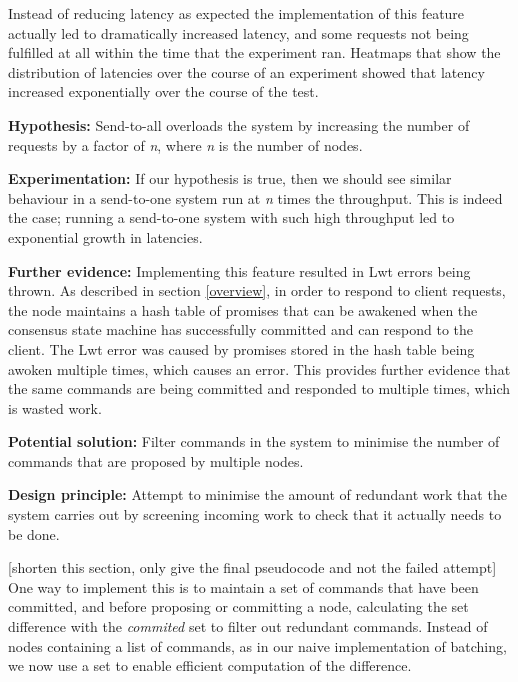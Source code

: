 Instead of reducing latency as expected the implementation of this feature actually led to dramatically increased latency, and some requests not being fulfilled at all within the time that the experiment ran. Heatmaps that show the distribution of latencies over the course of an experiment showed that latency increased exponentially over the course of the test.

\textbf{Hypothesis: } Send-to-all overloads the system by increasing the number of requests by a factor of \textit{n}, where \textit{n} is the number of nodes.

\textbf{Experimentation: } If our hypothesis is true, then we should see similar behaviour in a send-to-one system run at \textit{n} times the throughput. This is indeed the case; running a send-to-one system with such high throughput led to exponential growth in latencies.

\textbf{Further evidence: } Implementing this feature resulted in Lwt errors being thrown. As described in section \ref{overview}, in order to respond to client requests, the node maintains a hash table of promises that can be awakened when the consensus state machine has successfully committed and can respond to the client. The Lwt error was caused by promises stored in the hash table being awoken multiple times, which causes an error. This provides further evidence that the same commands are being committed and responded to multiple times, which is wasted work.

\textbf{Potential solution: } Filter commands in the system to minimise the number of commands that are proposed by multiple nodes.

\textbf{Design principle: } Attempt to minimise the amount of redundant work that the system carries out by screening incoming work to check that it actually needs to be done.

[shorten this section, only give the final pseudocode and not the failed attempt]
One way to implement this is to maintain a set of commands that have been committed, and before proposing or committing a node, calculating the set difference with the \textit{commited} set to filter out redundant commands. Instead of nodes containing a list of commands, as in our naive implementation of batching, we now use a set to enable efficient computation of the difference.

